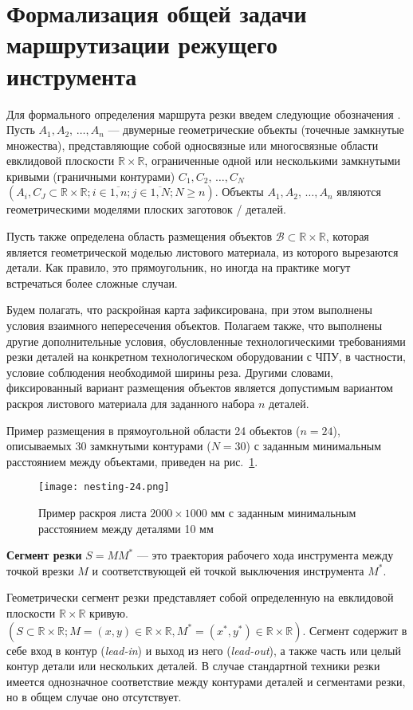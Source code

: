 
\section{%
Формализация общей задачи маршрутизации режущего инструмента
}
\label{sec:cut.stmt}

Для формального определения маршрута резки введем следующие обозначения
\cite{bi:book2020,bib:petunin-2019}.
Пусть
$A_1, A_2, \,\dots, A_n$
--- двумерные геометрические объекты
(точечные замкнутые множества),
представляющие собой односвязные или
многосвязные области евклидовой плоскости
$\mathbb R \times \mathbb R$,
ограниченные одной или несколькими замкнутыми кривыми
(граничными контурами)
$C_1, C_2, \,\dots, C_N$
$(A_i, C_J \subset \mathbb R \times \mathbb R;
i \in \overline{1,n};
j \in \overline{1, N};
N \geqslant n)$.
Объекты
$A_1, A_2, \,\dots, A_n$
являются геометрическими моделями плоских заготовок / деталей.

Пусть также определена область размещения объектов
$\mathcal B \subset \mathbb R \times \mathbb R$,
которая является геометрической моделью листового материала,
из которого вырезаются детали.
Как правило, это прямоугольник,
но иногда на практике могут встречаться
более сложные случаи.

Будем полагать, что раскройная карта зафиксирована,
при этом выполнены условия взаимного непересечения объектов.
Полагаем также, что выполнены другие дополнительные условия,
обусловленные технологическими требованиями резки деталей
на конкретном технологическом оборудовании с ЧПУ,
в частности, условие соблюдения необходимой ширины реза.
Другими словами, фиксированный вариант размещения объектов
является допустимым вариантом раскроя листового материала
для заданного набора $n$ деталей.

Пример размещения в прямоугольной области 24 объектов
($n=24$),
описываемых 30 замкнутыми контурами
($N=30$)
с заданным минимальным расстоянием между объектами,
приведен на рис.~\ref{fig:cut.nesting}.

\begin{figure}
  \centering
  \texttt{[image: nesting-24.png]}
  \caption{
    Пример раскроя листа $2000 \times 1000$ мм
    с заданным минимальным расстоянием между деталями 10 мм
  }
  \label{fig:cut.nesting}
\end{figure}

\begin{opred}
  \label{def:cutting-segment}
  \textbf{Сегмент резки}
  $S=MM^*$
  --- это траектория рабочего хода
  инструмента между точкой врезки
  $M$
  и соответствующей ей точкой выключения инструмента
  $M^*$.
\end{opred}
Геометрически сегмент резки представляет собой
определенную на евклидовой плоскости
$\mathbb R \times \mathbb R$
кривую.
$(S \subset \mathbb R \times \mathbb R;
M=(x,y) \in \mathbb R \times \mathbb R,
M^* =(x^*,y^*)\in \mathbb R \times \mathbb R)$.
Сегмент содержит в себе вход в контур
(\textit{lead-in})
и выход из него
(\textit{lead-out}),
а также часть или целый контур детали
или нескольких деталей.
В случае стандартной техники резки
имеется однозначное соответствие между
контурами деталей и сегментами резки,
но в общем случае оно отсутствует.

